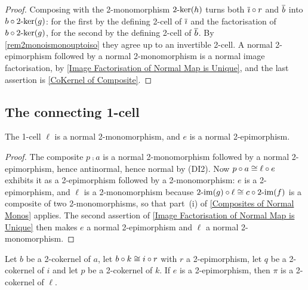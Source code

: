 \begin{proof}
  \leanok
  Composing with the 2-monomorphism \(2\text{-}\mathrm{ker}(h)\) turns both \(\overline{\imath}\circ r\) and \(\overline{b}\) into \(b\circ2\text{-}\mathrm{ker}(g)\): for the first by the defining 2-cell of \(\overline{\imath}\) and the factorisation of \(b\circ2\text{-}\mathrm{ker}(g)\), for the second by the defining 2-cell of \(\overline{b}\). By \remx\ref{rem2monoismonouptoiso} they agree up to an invertible 2-cell. A normal 2-epimorphism followed by a normal 2-monomorphism is a normal image factorisation, by \prox\ref{Image Factorisation of Normal Map is Unique}, and the last assertion is \prox\ref{CoKernel of Composite}.
\end{proof}

\subsection{The connecting 1-cell}\label{SS:Connecting}

\begin{lemma}
  \label{L:ImgMapNormal}   \leanok
  The 1-cell \(\ell\) is a normal 2-monomorphism, and \(e\) is a normal 2-epimorphism.
\end{lemma}

\begin{proof}
  \leanok
  The composite \(p\comp a\) is a normal 2-monomorphism followed by a normal 2-epimorphism, hence antinormal, hence normal by \textup{(DI2)}. Now \(p\circ a\cong\ell\circ e\) exhibits it as a 2-epimorphism followed by a 2-monomorphism: \(e\) is a 2-epimorphism, and \(\ell\) is a 2-monomorphism because \(2\text{-}\mathrm{im}(g)\circ\ell\cong c\circ2\text{-}\mathrm{im}(f)\) is a composite of two 2-monomorphisms, so that part~\textup{(i)} of \prox\ref{Composites of Normal Monos} applies. The second assertion of \prox\ref{Image Factorisation of Normal Map is Unique} then makes \(e\) a normal 2-epimorphism and \(\ell\) a normal 2-monomorphism.
\end{proof}

\begin{proposition}
  \label{P:RoutineVerification}   \leanok
  Let \(b\) be a 2-cokernel of \(a\), let \(b\circ k\cong i\circ r\) with \(r\) a 2-epimorphism, let \(q\) be a 2-cokernel of \(i\) and let \(p\) be a 2-cokernel of \(k\). If \(e\) is a 2-epimorphism, then \(\pi\) is a 2-cokernel of \(\ell\).
\end{proposition}

